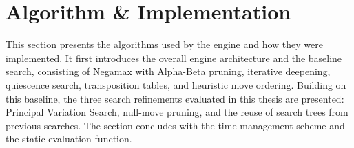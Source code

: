 \section{Algorithm \& Implementation}
\label{sec:algorithm_implementation}

This section presents the algorithms used by the engine and how they were
implemented. It first introduces the overall engine architecture and the
baseline search, consisting of Negamax with Alpha-Beta pruning, iterative
deepening, quiescence search, transposition tables, and heuristic move ordering.
Building on this baseline, the three search refinements evaluated in this thesis
are presented: Principal Variation Search, null-move pruning, and the reuse of
search trees from previous searches. The section concludes with the time
management scheme and the static evaluation function.








